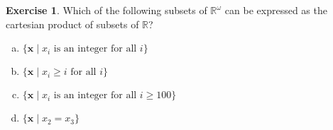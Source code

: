 \documentclass[11pt,a4paper,twoside]{article}
\theoremstyle{definition}
\newcounter{excounter}
\newtheorem{exercise}[excounter]{Exercise}
\begin{document}
\begin{exercise}

  Which of the following subsets of $\mathbb{R}^\omega$ can be expressed as the cartesian product of subsets of $\mathbb{R}$?
  \begin{enumerate}[(a)]
  \item $\{ \mathbf{x} \mid x_i \text{ is an integer for all } i \}$
  \item $\{ \mathbf{x} \mid x_i \geq i \text{ for all } i \}$
  \item $\{ \mathbf{x} \mid x_i \text{ is an integer for all } i \geq 100 \}$
  \item $\{ \mathbf{x} \mid x_2 = x_3 \}$
  \end{enumerate}

\end{exercise}
\end{document}
